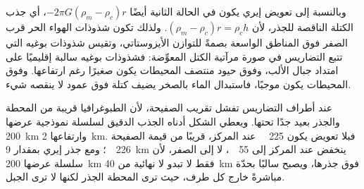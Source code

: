 وبالنسبة إلى تعويض إيري يكون  في الحالة الثانية أيضًا $-2\pi G(\rho_m - \rho_c)r$، أي جذب الكتلة الناقصة للجذر، لأن $(\rho_m - \rho_c)r = \rho_c h$. ولذلك تكون شذوذات الهواء الحر قرب الصفر فوق المناطق الواسعة بصمةً للتوازن الأيزوستاتي، وتقيس شذوذات بوغيه التي تتبع التضاريس في صورة مرآتية الكتل المعوِّضة: فشذوذات بوغيه سالبة إقليميًا على امتداد جبال الألب، وفوق حيود منتصف المحيطات يكون  صغيرًا رغم ارتفاعها. وفوق المحيطات يكون  موجبًا، فاستبدال الماء بالصخر يضيف كتلة فوق عمود لا ينقصه شيء.

عند أطراف التضاريس تفشل تقريب الصفيحة، لأن الطبوغرافيا قريبة من المحطة والجذر بعيد جدًا تحتها. ويعطي الشكل أدناه الجذب الدقيق لسلسلة نموذجية عرضها \qty{200}{km} وارتفاعها \qty{2}{km}. فبلا تعويض يكون  \qty{+225}{\milli\gal} عند المركز، قريبًا من قيمة الصفيحة \qty{226}{\milli\gal}؛ ومع جذر إيري بمقدار \qty{9}{km} ينخفض  عند المركز إلى \qty{+55}{\milli\gal}، لا إلى الصفر، لأن سلسلة عرضها \qty{200}{km} فقط لا تبدو لا نهائية من \qty{40}{km} فوق جذرها، ويصبح  سالبًا بحدّة مباشرةً خارج كل طرف، حيث ترى المحطة الجذر لكنها لا ترى الجبل.

